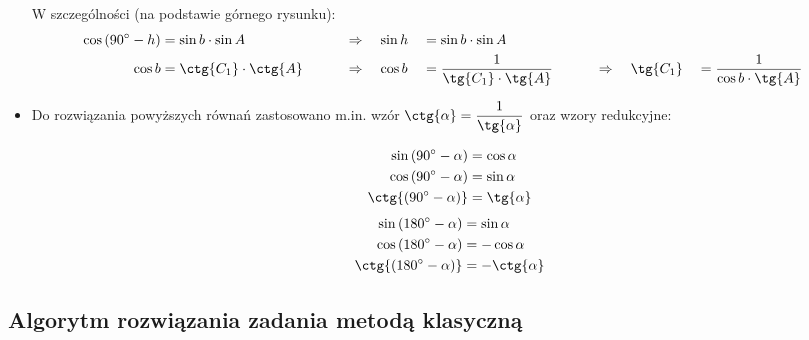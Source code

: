 \documentclass[10pt, twoside, fleqn]{article}
\begin{document}
\begin{itemize}
\begin{itemize}
						\end{itemize}	
												
									W szczególności (na podstawie górnego
									rysunku):
								\begin{alignat*}{6}
		\cos{(90\degree - h)}	&= \sin{b} \cdot \sin{A} 
				&&\hspace{20pt}\Rightarrow\hspace{10pt}
					\sin{h} &&= \sin{b} \cdot \sin{A}		\\
		\cos{b	}				&= \ctg{C_1} \cdot \ctg{A}
				&&\hspace{20pt}\Rightarrow\hspace{10pt}
					\cos{b}  &&= \frac{1}{\tg{C_1} \cdot \tg{A}}	
				&&\hspace{20pt}\Rightarrow\hspace{10pt}
					\tg{C_1} &&= \frac{1}{\cos{b} \cdot \tg{A}}							
								\end{alignat*}							
				
				\vspace{-\baselineskip}
				\item	Do rozwiązania powyższych równań zastosowano
						m.in. wzór $\displaystyle
								\ctg{\alpha} = \frac{1}{\tg{\alpha}}$ 
						oraz wzory redukcyjne:
		\begin{multicols}{2}
		\noindent
			\begin{align*}
				\sin{(90\degree - \alpha)} 	& = \cos{\alpha}		\\
				\cos{(90\degree - \alpha)} 	& = \sin{\alpha}		\\
				\ctg{(90\degree - \alpha)} 	& = \tg{\alpha}		
			\end{align*}
			\begin{align*}
				\sin{(180\degree - \alpha)} & =  \sin{\alpha}		\\
				\cos{(180\degree - \alpha)} & = -\cos{\alpha}		\\
				\ctg{(180\degree - \alpha)} & = -\ctg{\alpha}			
			\end{align*}		
		\end{multicols}
	
				\end{itemize}
	
\subsection{Algorytm rozwiązania zadania metodą klasyczną}
\end{document}

